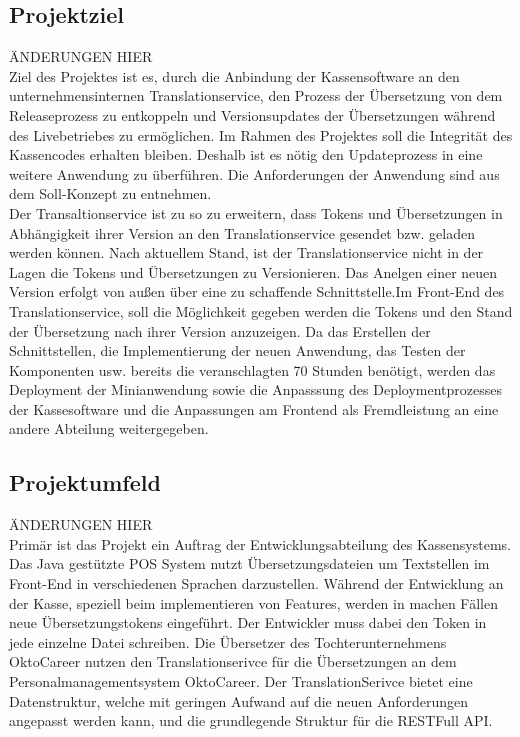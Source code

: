 \documentclass[10pt, oneside]{article}
\begin{document}
  \subsection{Projektziel}%
    ÄNDERUNGEN HIER\\
    Ziel des Projektes ist es, durch die Anbindung der Kassensoftware an den unternehmensinternen Translationservice,
    den Prozess der Übersetzung von dem Releaseprozess zu entkoppeln und Versionsupdates der Übersetzungen während des Livebetriebes zu ermöglichen.
    Im Rahmen des Projektes soll die Integrität des Kassencodes erhalten bleiben. Deshalb ist es nötig den Updateprozess 
    in eine weitere Anwendung zu überführen. Die Anforderungen der Anwendung sind aus dem Soll-Konzept zu entnehmen.\\
    Der Transaltionservice ist zu so zu erweitern, dass Tokens und Übersetzungen in Abhängigkeit ihrer Version an den 
    Translationservice gesendet bzw. geladen werden können.
    Nach aktuellem Stand, ist der Translationservice nicht in der Lagen die Tokens und Übersetzungen zu Versionieren. 
    Das Anelgen einer neuen Version erfolgt von außen über eine zu schaffende Schnittstelle.Im Front-End des Translationservice, soll die Möglichkeit gegeben 
    werden die Tokens und den Stand der Übersetzung nach ihrer Version anzuzeigen.
    Da das Erstellen der Schnittstellen, die Implementierung der neuen Anwendung, das Testen der Komponenten usw. bereits die veranschlagten 70 Stunden benötigt,
    werden das Deployment der Minianwendung sowie die Anpasssung des Deploymentprozesses der Kassesoftware und die Anpassungen am Frontend als Fremdleistung an eine andere Abteilung weitergegeben. 
  \subsection{Projektumfeld}\label{sec:projectEnv}%
    ÄNDERUNGEN HIER\\
    Primär ist das Projekt ein Auftrag der Entwicklungsabteilung des Kassensystems. Das Java gestützte POS System nutzt Übersetzungsdateien um Textstellen im Front-End in verschiedenen Sprachen darzustellen.
    Während der Entwicklung an der Kasse, speziell beim implementieren von Features, werden in machen Fällen neue Übersetzungstokens eingeführt. Der Entwickler muss dabei den Token in jede einzelne Datei schreiben. 
    Die Übersetzer des Tochterunternehmens OktoCareer nutzen den Translationserivce für die Übersetzungen an dem Personalmanagementsystem OktoCareer. 
    Der TranslationSerivce bietet eine Datenstruktur, welche mit geringen Aufwand auf die neuen Anforderungen angepasst werden kann, und die grundlegende Struktur für die RESTFull API. 
\end{document}

